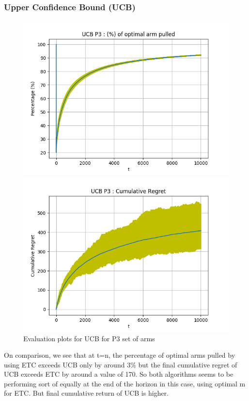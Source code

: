 \documentclass[12pt]{report}
\begin{document}
		\subsubsection{Upper Confidence Bound (UCB)}
			\begin{figure}[H]
				\begin{multicols}{2}
					\includegraphics[scale=0.5]{Figures/UCB_P3_op.png} \par
					\includegraphics[scale=0.5]{Figures/UCB_P3_ret.png}
				\end{multicols}
				\caption{Evaluation plots for UCB for P3 set of arms}
				\label{Fig5}
			\end{figure}
			
		\noindent On comparison, we see that at t=n, the percentage of optimal arms pulled by using ETC exceeds UCB only by around $3\%$ but the final cumulative regret of UCB exceeds ETC by around a value of 170. So both algorithms seems to be performing sort of equally at the end of the horizon in this case, using optimal m for ETC.	But final cumulative return of UCB is higher.
		
\end{document}
